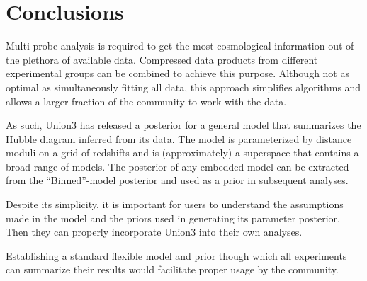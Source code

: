 \documentclass[11pt,a4paper]{article}
\begin{document}
\section{Conclusions}
\label{sec:conclusions}
Multi-probe  analysis is required to get the most cosmological information out of the plethora of available data. 
Compressed data products from different experimental groups can be combined to achieve this purpose.
Although not as optimal as simultaneously fitting all data, this approach simplifies algorithms and allows a larger
fraction of
the community to work with the data.

As such, Union3 has released a posterior for a general model that summarizes the Hubble diagram inferred from its data.
The model is parameterized by distance moduli on a grid of redshifts and is (approximately) a superspace that
contains a broad range of models.     The posterior of any embedded model can be
extracted from the  ``Binned''-model posterior and used as a prior in subsequent analyses.

Despite its simplicity, it is important for users to understand the assumptions made in the model and the priors used
in generating its parameter posterior.  Then they can properly incorporate Union3 into their own analyses.

Establishing a standard flexible model and prior though which all experiments can 
summarize their results would facilitate proper usage by the community.




\end{document}
